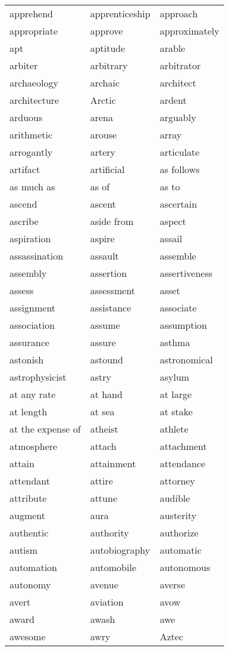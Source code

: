 \documentclass{minimal}
\begin{document}
\begin{longtable}{p{2.7cm}@{\hskip 0.2cm}p{2.7cm}@{\hskip 0.2cm}p{2.7cm}}
apprehend & apprenticeship & approach \\
appropriate & approve & approximately \\
apt & aptitude & arable \\
arbiter & arbitrary & arbitrator \\
archaeology & archaic & architect \\
architecture & Arctic & ardent \\
arduous & arena & arguably \\
arithmetic & arouse & array \\
arrogantly & artery & articulate \\
artifact & artificial & as follows \\
as much as & as of & as to \\
ascend & ascent & ascertain \\
ascribe & aside from & aspect \\
aspiration & aspire & assail \\
assassination & assault & assemble \\
assembly & assertion & assertiveness \\
assess & assessment & asset \\
assignment & assistance & associate \\
association & assume & assumption \\
assurance & assure & asthma \\
astonish & astound & astronomical \\
astrophysicist & astry & asylum \\
at any rate & at hand & at large \\
at length & at sea & at stake \\
at the expense of & atheist & athlete \\
atmosphere & attach & attachment \\
attain & attainment & attendance \\
attendant & attire & attorney \\
attribute & attune & audible \\
augment & aura & austerity \\
authentic & authority & authorize \\
autism & autobiography & automatic \\
automation & automobile & autonomous \\
autonomy & avenue & averse \\
avert & aviation & avow \\
award & awash & awe \\
awesome & awry & Aztec
\end{longtable}
\end{document}
